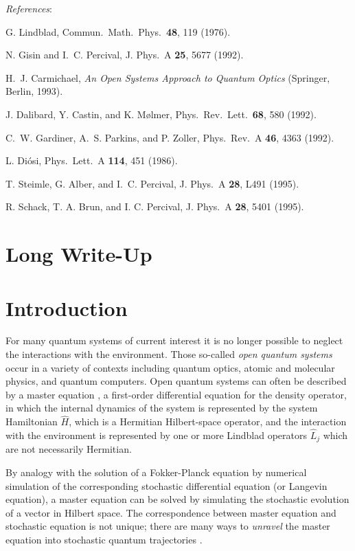 \vspace{3mm}\noindent
{\it References\/}:

\noindent[1] G. Lindblad, Commun.\ Math.\ Phys.\ {\bf 48},  119  (1976).

\noindent[2] N. Gisin and I.~C. Percival, J. Phys.\ A {\bf 25},  5677  (1992).

\noindent[3] H.~J. Carmichael, {\em An Open Systems Approach to Quantum
  Optics} (Springer, Berlin, 1993).

\noindent[4] J. Dalibard, Y. Castin, and K. M{\o}lmer, Phys.\ Rev.\ Lett.\
  {\bf 68}, 580 (1992).

\noindent[5] C.~W. Gardiner, A.~S. Parkins, and P. Zoller, Phys.\ Rev.\ A {\bf 46},  4363
  (1992).

\noindent[6] L. Di\'osi, Phys.\ Lett.\ A {\bf 114},  451  (1986).

\noindent[7] T. Steimle, G. Alber, and I.~C. Percival, 
  J. Phys.\ A {\bf 28}, L491 (1995).

\noindent[8] R. Schack, T. A. Brun, and I. C. Percival,
  J. Phys.\ A {\bf 28}, 5401 (1995).


\section*{Long Write-Up}

\section{Introduction}

For many quantum systems of current interest it is no longer possible
to neglect the interactions with the environment. Those
so-called {\it open quantum systems\/} occur in a variety of contexts
including quantum optics, atomic and molecular physics, and quantum
computers. Open quantum systems can often be described by a master
equation {\cite{Lindblad1976}}, a first-order differential equation
for the density operator, in which the internal dynamics of the 
system is represented by the system Hamiltonian $\hat H$, which is a
Hermitian Hilbert-space operator, and the interaction with the
environment is represented by one or more Lindblad operators $\hat L_j$
which are not necessarily Hermitian.

By analogy with the solution of a Fokker-Planck equation by numerical simulation
of the corresponding stochastic differential equation (or Langevin equation), a
master equation can be solved by simulating the stochastic evolution of a
vector in Hilbert space. The correspondence between
master equation and stochastic equation is not unique; there are many ways to
{\it unravel\/} the master equation into stochastic quantum trajectories
{\cite{Diosi1986,Gisin1992c,%
Carmichael1993b,Dalibard1992,Gardiner1992,Breslin1995}}.

